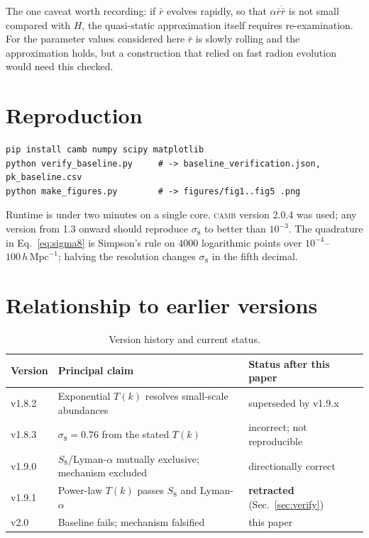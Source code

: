 \documentclass[11pt,a4paper]{article}
\newcommand{\hMpc}{h\,\mathrm{Mpc}^{-1}}
\begin{document}
The one caveat worth recording: if $\bar r$ evolves rapidly, so that
$\alpha\bar r\dot{\bar r}$ is not small compared with $H$, the quasi-static
approximation itself requires re-examination. For the parameter values considered
here $\bar r$ is slowly rolling and the approximation holds, but a construction that
relied on fast radion evolution would need this checked.

\section{Reproduction}

\begin{verbatim}
pip install camb numpy scipy matplotlib
python verify_baseline.py     # -> baseline_verification.json, pk_baseline.csv
python make_figures.py        # -> figures/fig1..fig5 .png
\end{verbatim}

\noindent
Runtime is under two minutes on a single core. \textsc{camb} version 2.0.4 was used;
any version from 1.3 onward should reproduce $\sigma_8$ to better than $10^{-3}$.
The quadrature in Eq.~\eqref{eq:sigma8} is Simpson's rule on $4000$ logarithmic
points over $10^{-4}$--$100\,\hMpc$; halving the resolution changes $\sigma_8$ in the
fifth decimal.

\section{Relationship to earlier versions}

\begin{table}[htb]
\centering
\small
\begin{tabular}{lll}
\toprule
Version & Principal claim & Status after this paper\\
\midrule
v1.8.2 & Exponential $T(k)$ resolves small-scale abundances & superseded by v1.9.x\\
v1.8.3 & $\sigma_8=0.76$ from the stated $T(k)$ & incorrect; not reproducible\\
v1.9.0 & $S_8$/Lyman-$\alpha$ mutually exclusive; mechanism excluded & directionally correct\\
v1.9.1 & Power-law $T(k)$ passes $S_8$ and Lyman-$\alpha$ & \textbf{retracted} (Sec.~\ref{sec:verify})\\
v2.0 & Baseline fails; mechanism falsified & this paper\\
\bottomrule
\end{tabular}
\caption{Version history and current status.}
\end{table}
\end{document}
